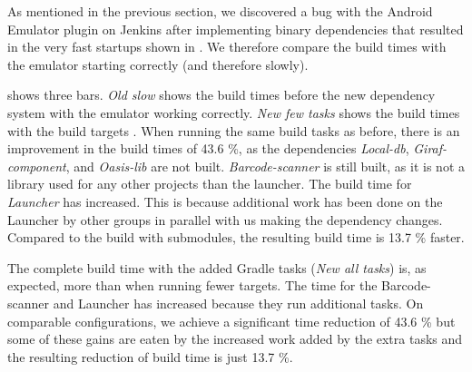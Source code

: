 As mentioned in the previous section, we discovered a bug with the Android Emulator plugin on Jenkins after implementing binary dependencies that resulted in the very fast startups shown in . We therefore compare the build times with the emulator starting correctly (and therefore slowly).

 shows three bars. \emph{Old slow} shows the build times before the new dependency system with the emulator working correctly. \emph{New few tasks} shows the build times with the build targets . When running the same build tasks as before, there is an improvement in the build times of 43.6 \%, as the dependencies \emph{Local-db}, \emph{Giraf-component}, and \emph{Oasis-lib} are not built. \emph{Barcode-scanner} is still built, as it is not a library used for any other projects than the launcher. The build time for \emph{Launcher} has increased. This is because additional work has been done on the Launcher by other groups in parallel with us making the dependency changes. Compared to the build with submodules, the resulting build time is 13.7 \% faster.

The complete build time with the added Gradle tasks (\emph{New all tasks}) is, as expected, more than when running fewer targets. The time for the Barcode-scanner and Launcher has increased because they run additional tasks. On comparable configurations, we achieve a significant time reduction of 43.6 \% but some of these gains are eaten by the increased work added by the extra tasks and the resulting reduction of build time is just 13.7 \%.

